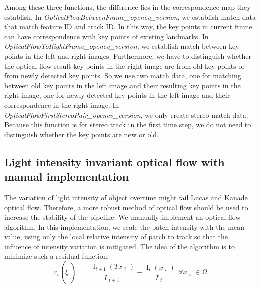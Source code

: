 \documentclass{easychair}
\begin{document}
Among these three functions, the difference lies in the correspondence map they establish. In \emph{OpticalFlowBetweenFrame\_opencv\_version}, we establish match data that match feature ID and track ID. In this way, the key points in current frame can have correspondence with key points of existing landmarks. In \emph{OpticalFlowToRightFrame\_opencv\_version}, we establish match between key points in the left and right images. Furthermore, we have to distinguish whether the optical flow result key points in the right image are from old key points or from newly detected key points. So we use two match data, one for matching between old key points in the left image and their resulting key points in the right image, one for newly detected key points in the left image and their correspondence in the right image. In \emph{OpticalFlowFirstStereoPair\_opencv\_version}, we only create stereo match data. Because this function is for stereo track in the first time step, we do not need to distinguish whether the key points are new or old.

\subsection{Light intensity invariant optical flow with manual implementation}
The variation of light intensity of object overtime might fail Lucas and Kanade optical flow. Therefore, a more robust method of optical flow should be used to increase the stability of the pipeline. We manually implement an optical flow algorithm. In this implementation, we scale the patch intensity with the mean value, using only the local relative intensity of patch to track so that the influence of intensity variation is mitigated. The idea of the algorithm is to minimize such a residual function:\\

\[{{r_i \left(  \xi  \left) \text{ }=\text{ }\frac{{\mathop{{I}}\nolimits_{{t+1}} \left( Tx\mathop{{}}\nolimits_{{i}} \right) }}{{ \overline {I\mathop{{}}\nolimits_{{t+1}}}}}\right. \right. }-\frac{{\mathop{{I}}\nolimits_{{t}} \left( x\mathop{{}}\nolimits_{{i}} \right) }}{{ \overline {I\mathop{{}}\nolimits_{{t}}}}}\text{ }\text{ } \forall x\mathop{{}}\nolimits_{{i}} \in  \Omega }\]
\end{document}
